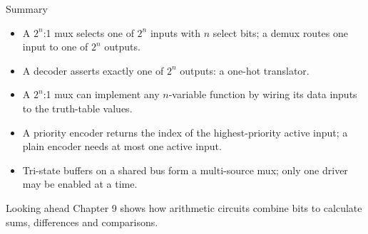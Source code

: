 \documentclass[9pt,aspectratio=169,xcolor=table]{beamer}
\begin{document}
\begin{frame}{Summary}
  \begin{itemize}\itemsep3pt\small
    \item A $2^n$:1 mux selects one of $2^n$ inputs with $n$ select bits; a demux routes one input to one of $2^n$ outputs.
    \item A decoder asserts exactly one of $2^n$ outputs: a one-hot translator.
    \item A $2^n$:1 mux can implement \alert{any} $n$-variable function by wiring its data inputs to the truth-table values.
    \item A priority encoder returns the index of the highest-priority active input; a plain encoder needs at most one active input.
    \item Tri-state buffers on a shared bus form a multi-source mux; only one driver may be enabled at a time.
  \end{itemize}
  \begin{block}{Looking ahead}
    Chapter 9 shows how arithmetic circuits combine bits to calculate sums, differences and comparisons.
  \end{block}
\end{frame}
\end{document}
